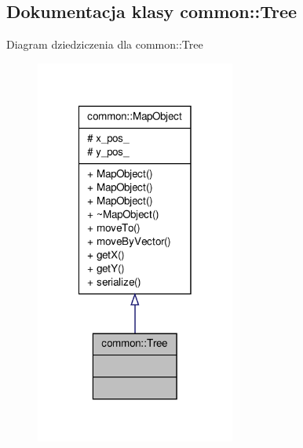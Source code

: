 \hypertarget{classcommon_1_1Tree}{\subsection{Dokumentacja klasy common\-:\-:Tree}
\label{classcommon_1_1Tree}
}


Diagram dziedziczenia dla common\-:\-:Tree
\nopagebreak
\begin{figure}[H]
\begin{center}
\leavevmode
\includegraphics[width=186pt]{classcommon_1_1Tree__inherit__graph}
\end{center}
\end{figure}


